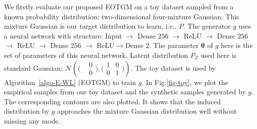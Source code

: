 {We firstly evaluate our proposed EOTGM on a toy dataset sampled from a known probability
  distribution: two-dimensional four-mixture Gaussian. This mixture Gaussian is our target distribution to learn, i.e., $P$. The generator $g$ uses a neural network with structure: Input $\rightarrow$ Dense $256$ $\rightarrow$ ReLU $\rightarrow$ Dense $256$ $\rightarrow$ ReLU $\rightarrow$ Dense $256$ $\rightarrow$ ReLU$\rightarrow$Dense $2$. The parameter $\bm{\theta} $ of $g$ here is the set of parameters of this neural network. Latent distribution $P_Z$ used here is standard Gaussian: $\mathcal{N}\left(\bigl(\begin{smallmatrix}& 0\\
    &0\end{smallmatrix}\bigr) ,\bigl( \begin{smallmatrix}1 & 0\\ 0 &
    1\end{smallmatrix}  \bigr)\right)$.
The toy dataset is used by Algorithm~\autoref{algo-E-WL} (EOTGM) to train $g$. In Fig.\ref{fig-toy}, we plot the empirical samples from our toy dataset and the synthetic samples generated by $g$. The corresponding contours are also plotted. It shows that the induced distribution by $g$ approaches the mixture Gaussian distribution well without missing any mode.}          
